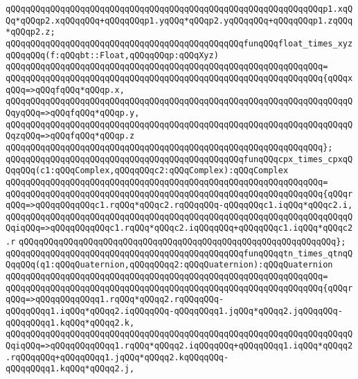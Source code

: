 \verb|qQQqqQQqqQQqqQQqqQQqqQQqqQQqqQQqqQQqqQQqqQQqqQQqqQQqqQQqqQQqqQQqp1.xqQQq*qQQqp2.xqQQqqQQq+qQQqqQQqp1.yqQQq*qQQqp2.yqQQqqQQq+qQQqqQQqp1.zqQQq*qQQqp2.z;|\newline
\newline
\verb|qQQqqQQqqQQqqQQqqQQqqQQqqQQqqQQqqQQqqQQqqQQqqQQqfunqQQqfloat_times_xyzqQQqqQQq(f:qQQqbt::Float,qQQqqQQqp:qQQqXyz)|\newline
\verb|qQQqqQQqqQQqqQQqqQQqqQQqqQQqqQQqqQQqqQQqqQQqqQQqqQQqqQQqqQQqqQQq=|\newline
\verb|qQQqqQQqqQQqqQQqqQQqqQQqqQQqqQQqqQQqqQQqqQQqqQQqqQQqqQQqqQQqqQQq{qQQqxqQQq=>qQQqfqQQq*qQQqp.x,|\newline
\verb|qQQqqQQqqQQqqQQqqQQqqQQqqQQqqQQqqQQqqQQqqQQqqQQqqQQqqQQqqQQqqQQqqQQqqQQqyqQQq=>qQQqfqQQq*qQQqp.y,|\newline
\verb|qQQqqQQqqQQqqQQqqQQqqQQqqQQqqQQqqQQqqQQqqQQqqQQqqQQqqQQqqQQqqQQqqQQqqQQqzqQQq=>qQQqfqQQq*qQQqp.z|\newline
\verb|qQQqqQQqqQQqqQQqqQQqqQQqqQQqqQQqqQQqqQQqqQQqqQQqqQQqqQQqqQQqqQQq};|\newline
\newline
\verb|qQQqqQQqqQQqqQQqqQQqqQQqqQQqqQQqqQQqqQQqqQQqqQQqfunqQQqcpx_times_cpxqQQqqQQq(c1:qQQqComplex,qQQqqQQqc2:qQQqComplex):qQQqComplex|\newline
\verb|qQQqqQQqqQQqqQQqqQQqqQQqqQQqqQQqqQQqqQQqqQQqqQQqqQQqqQQqqQQqqQQq=|\newline
\verb|qQQqqQQqqQQqqQQqqQQqqQQqqQQqqQQqqQQqqQQqqQQqqQQqqQQqqQQqqQQqqQQq{qQQqrqQQq=>qQQqqQQqqQQqc1.rqQQq*qQQqc2.rqQQqqQQq-qQQqqQQqc1.iqQQq*qQQqc2.i,|\newline
\verb|qQQqqQQqqQQqqQQqqQQqqQQqqQQqqQQqqQQqqQQqqQQqqQQqqQQqqQQqqQQqqQQqqQQqqQQqiqQQq=>qQQqqQQqqQQqc1.rqQQq*qQQqc2.iqQQqqQQq+qQQqqQQqc1.iqQQq*qQQqc2.r|\newline
\verb|qQQqqQQqqQQqqQQqqQQqqQQqqQQqqQQqqQQqqQQqqQQqqQQqqQQqqQQqqQQqqQQq};|\newline
\verb|qQQqqQQqqQQqqQQqqQQqqQQqqQQqqQQqqQQqqQQqqQQqqQQqfunqQQqqtn_times_qtnqQQqqQQq(q1:qQQqQuaternion,qQQqqQQqq2:qQQqQuaternion):qQQqQuaternion|\newline
\verb|qQQqqQQqqQQqqQQqqQQqqQQqqQQqqQQqqQQqqQQqqQQqqQQqqQQqqQQqqQQqqQQq=|\newline
\verb|qQQqqQQqqQQqqQQqqQQqqQQqqQQqqQQqqQQqqQQqqQQqqQQqqQQqqQQqqQQqqQQq{qQQqrqQQq=>qQQqqQQqqQQqq1.rqQQq*qQQqq2.rqQQqqQQq-qQQqqQQqq1.iqQQq*qQQqq2.iqQQqqQQq-qQQqqQQqq1.jqQQq*qQQqq2.jqQQqqQQq-qQQqqQQqq1.kqQQq*qQQqq2.k,|\newline
\verb|qQQqqQQqqQQqqQQqqQQqqQQqqQQqqQQqqQQqqQQqqQQqqQQqqQQqqQQqqQQqqQQqqQQqqQQqiqQQq=>qQQqqQQqqQQqq1.rqQQq*qQQqq2.iqQQqqQQq+qQQqqQQqq1.iqQQq*qQQqq2.rqQQqqQQq+qQQqqQQqq1.jqQQq*qQQqq2.kqQQqqQQq-qQQqqQQqq1.kqQQq*qQQqq2.j,|\newline
